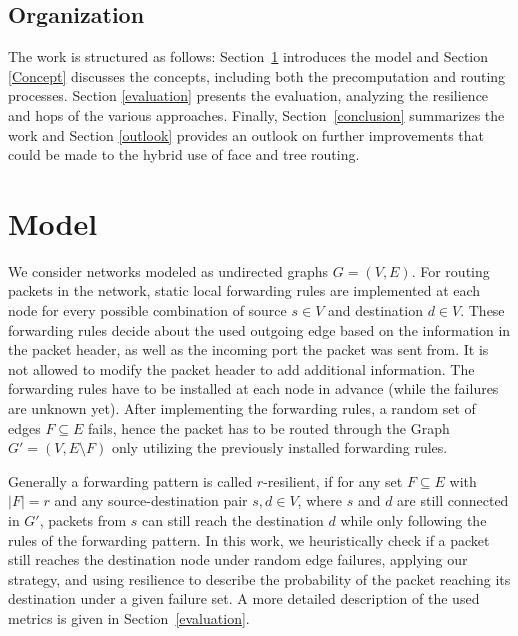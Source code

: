 \documentclass[conference]{IEEEtran}
\begin{document}
\subsection{Organization}
The work is structured as follows: Section~\ref{Model} introduces the model and Section \ref{Concept} discusses the concepts, including both the precomputation and routing processes. Section \ref{evaluation} presents the evaluation, analyzing the resilience and hops of the various approaches. Finally, Section~\ref{conclusion} summarizes the work and Section \ref{outlook} provides an outlook on further improvements that could be made to the hybrid use of face and tree routing.
 
\section{Model}
\label{Model}
We consider networks modeled as undirected graphs $G = (V,E)$. 
For routing packets in the network, static local forwarding rules are implemented at each node for every possible combination
of source $s \in V$ and destination $d \in V$. These forwarding rules 
decide about the used outgoing edge based on the information in the
packet header, as well as the incoming port the packet was sent from. It is not allowed to modify the 
packet header to add additional information. The forwarding rules have to be installed at each node
in advance (while the failures are unknown yet). After implementing the forwarding rules, a random 
set of edges $F \subseteq E$ fails, hence the packet has to be routed
through the Graph $G' = (V, E \setminus F)$ only utilizing the previously installed forwarding rules.

Generally a forwarding pattern is called $r$-resilient, if for any set $F \subseteq E$ with $|F| = r$ 
and any source-destination pair $s,d \in V$, where $s$ and $d$ are still connected in $G'$,
packets from $s$ can still reach the destination $d$ while only following the rules of the forwarding pattern. In 
this work, we heuristically check
if a packet still reaches the destination node under random edge failures, applying our strategy, and using 
resilience to describe the probability
of the packet reaching its destination under a given failure set. A more detailed description of the used
metrics is given in Section~\ref{evaluation}.
\end{document}
